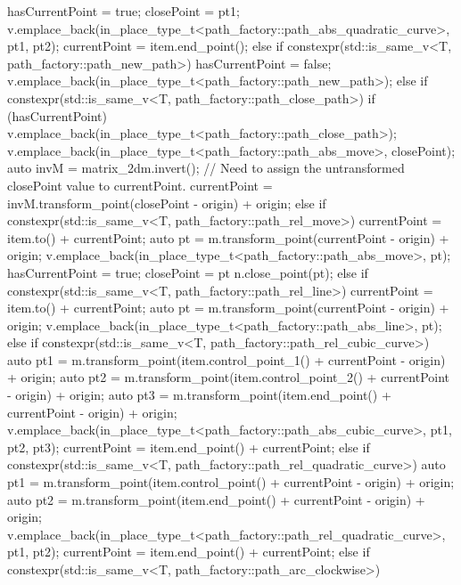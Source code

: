\begin{codeblock}
{{{{      		hasCurrentPoint = true;
      		closePoint = pt1;
      	}
      	v.emplace_back(in_place_type_t<path_factory::path_abs_quadratic_curve>,
      	  pt1, pt2);
      	currentPoint = item.end_point();
      }
      else if constexpr(std::is_same_v<T, path_factory::path_new_path>) {
        hasCurrentPoint = false;
        v.emplace_back(in_place_type_t<path_factory::path_new_path>);
      }
      else if constexpr(std::is_same_v<T, path_factory::path_close_path>) {
        if (hasCurrentPoint) {
          v.emplace_back(in_place_type_t<path_factory::path_close_path>);
          v.emplace_back(in_place_type_t<path_factory::path_abs_move>,
            closePoint);
          auto invM = matrix_2d{m}.invert();
          // Need to assign the untransformed closePoint value to currentPoint.
          currentPoint = invM.transform_point(closePoint - origin) + origin;
        }
      }
      else if constexpr(std::is_same_v<T, path_factory::path_rel_move>) {
        currentPoint = item.to() + currentPoint;
        auto pt = m.transform_point(currentPoint - origin) + origin;
        v.emplace_back(in_place_type_t<path_factory::path_abs_move>, pt);
        hasCurrentPoint = true;
        closePoint = pt    
        n.close_point(pt);
      }
      else if constexpr(std::is_same_v<T, path_factory::path_rel_line>) {
        currentPoint = item.to() + currentPoint;
        auto pt = m.transform_point(currentPoint - origin) + origin;
        v.emplace_back(in_place_type_t<path_factory::path_abs_line>, pt);
      }
      else if constexpr(std::is_same_v<T, path_factory::path_rel_cubic_curve>) {
        auto pt1 = m.transform_point(item.control_point_1() + currentPoint -
        origin) + origin;
        auto pt2 = m.transform_point(item.control_point_2() + currentPoint -
        origin) + origin;
        auto pt3 = m.transform_point(item.end_point() + currentPoint - origin) +
          origin;
        v.emplace_back(in_place_type_t<path_factory::path_abs_cubic_curve>,
          pt1, pt2, pt3);
        currentPoint = item.end_point() + currentPoint;
      }
      else if constexpr(std::is_same_v<T,
      path_factory::path_rel_quadratic_curve>) {
      	auto pt1 = m.transform_point(item.control_point() + currentPoint -
      	  origin) + origin;
      	auto pt2 = m.transform_point(item.end_point() + currentPoint -
      	  origin) + origin;
      	v.emplace_back(in_place_type_t<path_factory::path_rel_quadratic_curve>,
      	pt1, pt2);
      	currentPoint = item.end_point() + currentPoint;
      }
      else if constexpr(std::is_same_v<T, path_factory::path_arc_clockwise>) {
}}}
\end{codeblock}
